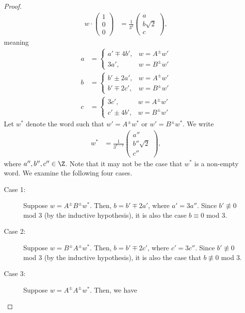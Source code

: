 \begin{proof}
\begin{align*}
    w \cdot \begin{pmatrix}1\\0\\0\end{pmatrix} &= \frac{1}{3^k} \begin{pmatrix}a\\b\sqrt{2}\\c\end{pmatrix},
  \end{align*}
  meaning
  \begin{align*}
    a &= \begin{cases}
      a'\mp 4b', & w = A^{\pm} w'\\
      3a', & w = B^{\pm}w'
    \end{cases}\\
      b &= \begin{cases}
        b'\pm 2a', & w = A^{\pm}w'\\
        b'\mp 2c', & w = B^{\pm}w'
      \end{cases}\\
        c &= \begin{cases}
          3c', & w = A^{\pm}w'\\
          c' \pm 4b', & w = B^{\pm}w'
        \end{cases}
  \end{align*}
  Let $w^{\ast}$ denote the word such that $w' = A^{\pm}w^{\ast}$ or $w' = B^{\pm}w^{\ast}$. We write
  \begin{align*}
    w^{\ast} &= \frac{1}{3^{k-2}} \begin{pmatrix}a''\\b''\sqrt{2}\\c''\end{pmatrix},
  \end{align*}
  where $a'',b'',c''\in \Z$. Note that it may not be the case that $w^{\ast}$ is a non-empty word. We examine the following four cases.
  \begin{description}
    \item[Case 1:] Suppose $w = A^{\pm}B^{\pm}w^{\ast}$. Then, $b = b'\mp 2a'$, where $a' = 3a''$. Since $b'\nequiv 0$ mod $3$ (by the inductive hypothesis), it is also the case $b\equiv 0$ mod $3$.
    \item[Case 2:] Suppose $w = B^{\pm}A^{\pm}w^{\ast}$. Then, $b = b'\mp 2c'$, where $c' = 3c''$. Since $b'\nequiv 0$ mod $3$ (by the inductive hypothesis), it is also the case that $b\nequiv 0$ mod $3$.
    \item[Case 3:] Suppose $w = A^{\pm}A^{\pm}w^{\ast}$. Then, we have

\end{description}
\end{proof}
